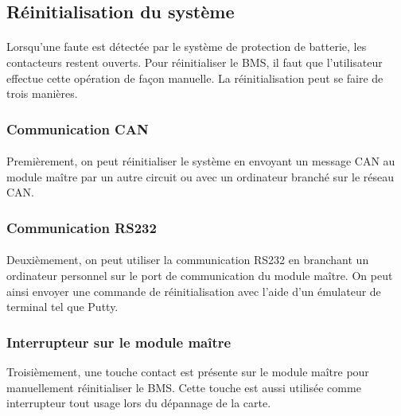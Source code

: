 \subsection{Réinitialisation du système}

	\paragraph*{}
	Lorsqu'une faute est détectée par le système de protection de batterie, les contacteurs restent ouverts. Pour réinitialiser le BMS, il faut que l'utilisateur effectue cette opération de façon manuelle. La réinitialisation peut se faire de trois manières.
		
	\subsubsection{Communication CAN}
		\paragraph*{}
		Premièrement, on peut réinitialiser le système en envoyant un message CAN au module maître par un autre circuit ou avec un ordinateur branché sur le réseau CAN. 

	\subsubsection{Communication RS232}
		\paragraph*{}	
		Deuxièmement, on peut utiliser la communication RS232 en branchant un ordinateur personnel sur le port de communication du module maître. On peut ainsi envoyer une commande de réinitialisation avec l'aide d'un émulateur de terminal tel que Putty.
				
	\subsubsection{Interrupteur sur le module maître}
		Troisièmement, une touche contact est présente sur le module maître pour manuellement réinitialiser le BMS. Cette touche est aussi utilisée comme interrupteur tout usage lors du dépannage de la carte.